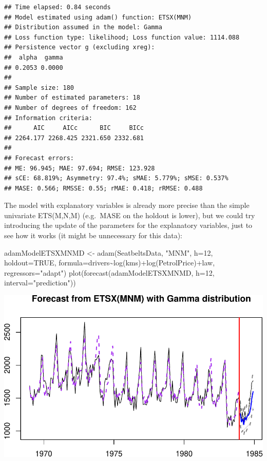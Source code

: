 \documentclass[
]{book}
\newenvironment{Shaded}{\begin{snugshade}}{\end{snugshade}}
\newcommand{\AttributeTok}[1]{\textcolor[rgb]{0.77,0.63,0.00}{#1}}
\newcommand{\ConstantTok}[1]{\textcolor[rgb]{0.00,0.00,0.00}{#1}}
\newcommand{\DecValTok}[1]{\textcolor[rgb]{0.00,0.00,0.81}{#1}}
\newcommand{\FunctionTok}[1]{\textcolor[rgb]{0.00,0.00,0.00}{#1}}
\newcommand{\NormalTok}[1]{#1}
\newcommand{\OtherTok}[1]{\textcolor[rgb]{0.56,0.35,0.01}{#1}}
\newcommand{\SpecialCharTok}[1]{\textcolor[rgb]{0.00,0.00,0.00}{#1}}
\newcommand{\StringTok}[1]{\textcolor[rgb]{0.31,0.60,0.02}{#1}}
\theoremstyle{definition}
\theoremstyle{definition}
\theoremstyle{definition}
\theoremstyle{definition}
\theoremstyle{remark}
\begin{document}
\begin{verbatim}
## Time elapsed: 0.84 seconds
## Model estimated using adam() function: ETSX(MNM)
## Distribution assumed in the model: Gamma
## Loss function type: likelihood; Loss function value: 1114.088
## Persistence vector g (excluding xreg):
##  alpha  gamma 
## 0.2053 0.0000 
## 
## Sample size: 180
## Number of estimated parameters: 18
## Number of degrees of freedom: 162
## Information criteria:
##      AIC     AICc      BIC     BICc 
## 2264.177 2268.425 2321.650 2332.681 
## 
## Forecast errors:
## ME: 96.945; MAE: 97.694; RMSE: 123.928
## sCE: 68.819%; Asymmetry: 97.4%; sMAE: 5.779%; sMSE: 0.537%
## MASE: 0.566; RMSSE: 0.55; rMAE: 0.418; rRMSE: 0.488
\end{verbatim}

The model with explanatory variables is already more precise than the simple univariate ETS(M,N,M) (e.g.~MASE on the holdout is lower), but we could try introducing the update of the parameters for the explanatory variables, just to see how it works (it might be unnecessary for this data):

\begin{Shaded}
\begin{Highlighting}[]
\NormalTok{adamModelETSXMNMD }\OtherTok{\textless{}{-}} \FunctionTok{adam}\NormalTok{(SeatbeltsData, }\StringTok{"MNM"}\NormalTok{, }\AttributeTok{h=}\DecValTok{12}\NormalTok{, }\AttributeTok{holdout=}\ConstantTok{TRUE}\NormalTok{,}
                          \AttributeTok{formula=}\NormalTok{drivers}\SpecialCharTok{\textasciitilde{}}\FunctionTok{log}\NormalTok{(kms)}\SpecialCharTok{+}\FunctionTok{log}\NormalTok{(PetrolPrice)}\SpecialCharTok{+}\NormalTok{law,}
                          \AttributeTok{regressors=}\StringTok{"adapt"}\NormalTok{)}
\FunctionTok{plot}\NormalTok{(}\FunctionTok{forecast}\NormalTok{(adamModelETSXMNMD, }\AttributeTok{h=}\DecValTok{12}\NormalTok{, }\AttributeTok{interval=}\StringTok{"prediction"}\NormalTok{))}
\end{Highlighting}
\end{Shaded}

\includegraphics{adam_files/figure-latex/unnamed-chunk-83-1.pdf}
\end{document}
